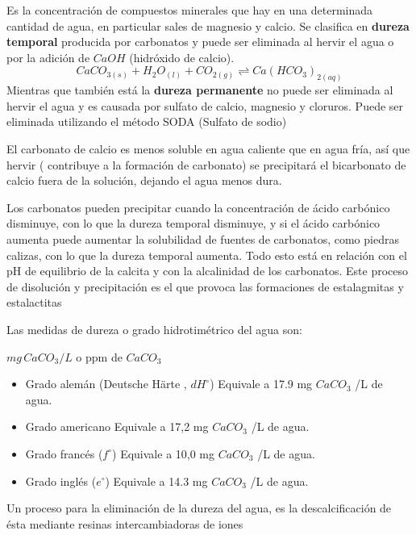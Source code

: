 \begin{definition}[Dureza]Es la concentración de compuestos minerales que hay en una determinada cantidad de agua, en particular sales de magnesio y calcio. 
    Se clasifica en \textbf{dureza temporal}
    producida  por carbonatos y puede ser eliminada al hervir el agua o por la adición de $CaOH$ (hidróxido de calcio).
\begin{equation}
    CaCO_{3(s)}+H_2O_{(l)}+CO_{2(g)}\rightleftharpoons Ca(HCO_3)_{2(aq)}
\end{equation}
Mientras que también está la \textbf{dureza permanente} no puede ser eliminada al hervir el agua y es causada por sulfato de calcio, magnesio y cloruros. Puede ser eliminada utilizando el método SODA (Sulfato de sodio)
\end{definition}

El carbonato de calcio es menos soluble en agua caliente que en agua fría, así que hervir
( contribuye a la formación de carbonato) se precipitará el bicarbonato de calcio fuera de la
solución, dejando el agua menos dura.

Los carbonatos pueden precipitar cuando la concentración de
ácido carbónico disminuye, con lo
que la dureza temporal disminuye, y si el ácido carbónico aumenta puede aumentar la solubilidad
de fuentes de carbonatos, como piedras calizas, con lo que la dureza temporal aumenta.
Todo esto está en relación con el pH de equilibrio de la calcita y con la alcalinidad de los
carbonatos. Este proceso de disolución y precipitación es el que provoca las formaciones de
estalagmitas y estalactitas

Las medidas de dureza o grado hidrotimétrico del agua son:

$mg\, CaCO_3 /L$ o ppm de $CaCO_3$

\begin{itemize}
    \item Grado alemán (Deutsche Härte , $dH^{\circ}$) Equivale a 17.9 mg $CaCO_3$ /L de agua.
    \item Grado americano Equivale a 17,2 mg $CaCO_3$ /L de agua.
    \item Grado francés ($f^{\circ}$) Equivale a 10,0 mg $CaCO_3$ /L de agua.
    \item Grado inglés ($e^{\circ}$) Equivale a 14.3 mg $CaCO_3$ /L de agua. 
\end{itemize}

Un proceso para la eliminación de la dureza del agua, es la descalcificación de ésta mediante resinas intercambiadoras de iones

